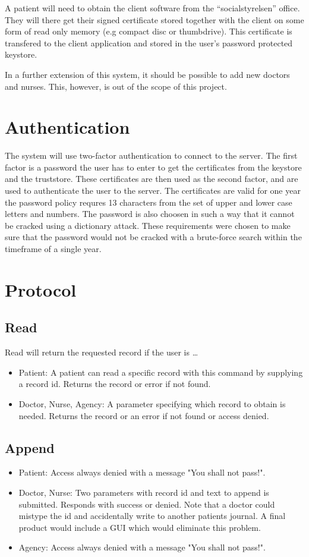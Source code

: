 \documentclass[10pt, a4paper]{article}
\begin{document}
A patient will need to obtain the client software from the ``socialstyrelsen'' office. They will there get their signed certificate stored together with the client on some form of read only memory (e.g compact disc or thumbdrive). This certificate is transfered to the client application and stored in the user's password protected keystore. 

In a further extension of this system, it should be possible to add new doctors and nurses. This, however, is out of the scope of this project.

\section{Authentication}
The system will use two-factor authentication to connect to the server. The first factor is a password the user has to enter to get the certificates from the keystore and the truststore. These certificates are then used as the second factor, and are used to authenticate the user to the server. The certificates are valid for one year the password policy requres 13 characters from the set of upper and lower case letters and numbers. The password is also choosen in such a way that it cannot be cracked using a dictionary attack. These requirements were chosen to make sure that the password would not be cracked with a brute-force search within the timeframe of a single year.

\section{Protocol}
\subsection{Read}
Read will return the requested record if the user is \ldots
\begin{itemize}
	\item Patient: A patient can read a specific record with this command by supplying a record id. Returns the record or error if not found.
	\item Doctor, Nurse, Agency: A parameter specifying which record to obtain is needed. Returns the record or an error if not found or access denied.
\end{itemize}

\subsection{Append}
\begin{itemize}
\item Patient: Access always denied with a message "You shall not pass!".
\item Doctor, Nurse: Two parameters with record id and text to append is submitted. Responds with success or denied. Note that a doctor could mistype the id and accidentally write to another patients journal. A final product would include a GUI which would eliminate this problem.
\item Agency: Access always denied with a message "You shall not pass!".
\end{itemize}
\end{document}
